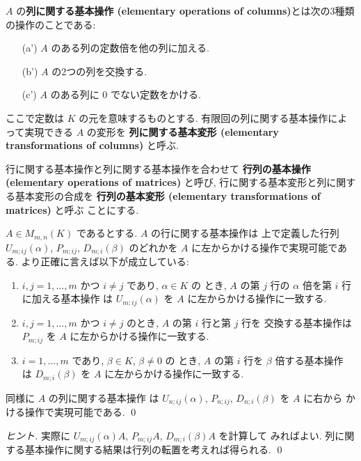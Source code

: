 \documentclass[12pt,twoside]{jarticle}
\begin{document}
$A$ の{\bf 列に関する基本操作 (elementary operations of columns)}とは次の3種類
の操作のことである:
\begin{enumerate}
\item[(a')] $A$ のある列の定数倍を他の列に加える.
\item[(b')] $A$ の2つの列を交換する.
\item[(c')] $A$ のある列に $0$ でない定数をかける.
\end{enumerate}
ここで定数は $K$ の元を意味するものとする.
有限回の列に関する基本操作によって実現できる $A$ の変形を
{\bf 列に関する基本変形 (elementary transformations of columns)} と呼ぶ.

行に関する基本操作と列に関する基本操作を合わせて
{\bf 行列の基本操作 (elementary operations of matrices)} と呼び,
行に関する基本変形と列に関する基本変形の合成を
{\bf 行列の基本変形 (elementary transformations of matrices)} と呼ぶ
ことにする.

\begin{question}[行列の基本操作の可逆な行列の積による実現, 5点]
  \label{q:elem-op}
  $A\in M_{m,n}(K)$ であるとする.
  $A$ の行に関する基本操作は
  上で定義した行列 $U_{m;ij}(\alpha)$, $P_{m;ij}$, $D_{m;i}(\beta)$ 
  のどれかを $A$ に左からかける操作で実現可能である.  
  より正確に言えば以下が成立している:
  \begin{enumerate}
  \item $i,j=1,\ldots,m$ かつ $i\ne j$ であり, $\alpha\in K$ の
    とき, $A$ の第 $j$ 行の $\alpha$ 倍を第 $i$ 行に加える基本操作
    は $U_{m;ij}(\alpha)$ を $A$ に左からかける操作に一致する.
  \item $i,j=1,\ldots,m$ かつ $i\ne j$ のとき, $A$ の第 $i$ 行と第 $j$ 行を
    交換する基本操作は $P_{m;ij}$ を $A$ に左からかける操作に一致する.
  \item $i=1,\ldots,m$ であり, $\beta\in K$, $\beta\ne 0$ の
    とき, $A$ の第 $i$ 行を $\beta$ 倍する基本操作
    は $D_{m;i}(\beta)$ を $A$ に左からかける操作に一致する.
  \end{enumerate}
  同様に   $A$ の列に関する基本操作
  は $U_{n;ij}(\alpha)$, $P_{n;ij}$, $D_{n;i}(\beta)$ を $A$ に右から
  かける操作で実現可能である. 
  \qed
\end{question}

\begin{proof}[ヒント]
  実際に $U_{m;ij}(\alpha)A$, $P_{m;ij}A$, $D_{m;i}(\beta)A$ を計算して
  みればよい. 列に関する基本操作に関する結果は行列の転置を考えれば得られる.
  \qed
\end{proof}
\end{document}
